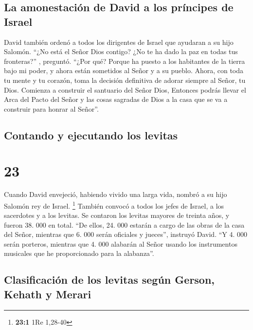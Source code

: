 \hypertarget{la-amonestaciuxf3n-de-david-a-los-pruxedncipes-de-israel}{%
\subsection{La amonestación de David a los príncipes de
Israel}\label{la-amonestaciuxf3n-de-david-a-los-pruxedncipes-de-israel}}

 David también ordenó a todos los dirigentes de Israel
que ayudaran a su hijo Salomón.  ``¿No está el Señor Dios
contigo? ¿No te ha dado la paz en todas tus fronteras?'' , preguntó.
``¿Por qué? Porque ha puesto a los habitantes de la tierra bajo mi
poder, y ahora están sometidos al Señor y a su pueblo. 
Ahora, con toda tu mente y tu corazón, toma la decisión definitiva de
adorar siempre al Señor, tu Dios. Comienza a construir el santuario del
Señor Dios, Entonces podrás llevar el Arca del Pacto del Señor y las
cosas sagradas de Dios a la casa que se va a construir para honrar al
Señor''.

\hypertarget{contando-y-ejecutando-los-levitas}{%
\subsection{Contando y ejecutando los
levitas}\label{contando-y-ejecutando-los-levitas}}

\hypertarget{section-22}{%
\section{23}\label{section-22}}

 Cuando David envejeció, habiendo vivido una larga vida,
nombró a su hijo Salomón rey de Israel. \footnote{\textbf{23:1} 1Re
  1,28-40}  También convocó a todos los jefes de Israel, a
los sacerdotes y a los levitas.  Se contaron los levitas
mayores de treinta años, y fueron 38. 000 en total.  ``De
ellos, 24. 000 estarán a cargo de las obras de la casa del Señor,
mientras que 6. 000 serán oficiales y jueces'', instruyó David.
 ``Y 4. 000 serán porteros, mientras que 4. 000 alabarán
al Señor usando los instrumentos musicales que he proporcionado para la
alabanza''.

\hypertarget{clasificaciuxf3n-de-los-levitas-seguxfan-gerson-kehath-y-merari}{%
\subsection{Clasificación de los levitas según Gerson, Kehath y
Merari}\label{clasificaciuxf3n-de-los-levitas-seguxfan-gerson-kehath-y-merari}}


